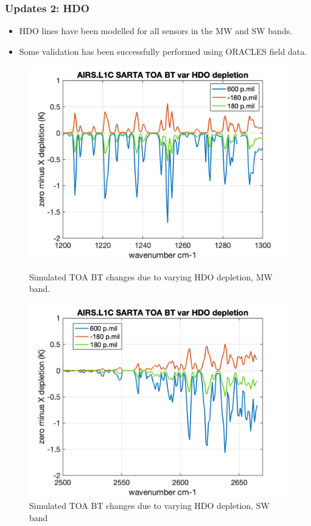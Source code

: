 \documentclass[10pt,t]{beamer}
\begin{document}
\begin{frame}
  \frametitle{Updates 2: HDO}
  \begin{itemize}
    \item HDO lines have been modelled for all sensors in the MW and SW bands.
    \item Some validation has been successfully performed using ORACLES field data.
  \end{itemize}

\begin{figure}
\begin{minipage}[c]{0.45\linewidth}
  \includegraphics[width=\linewidth]{./Figs/airs_l1c_hdo_r49_mw_var_depletion.png}
  \caption{Simulated TOA BT changes due to varying HDO depletion, MW band.}
\end{minipage}
\hfill
\begin{minipage}[c]{0.45\linewidth}
  \includegraphics[width=\linewidth]{./Figs/airs_l1c_hdo_r49_sw_var_depletion.png}
  \caption{Simulated TOA BT changes due to varying HDO depletion, SW band}
\end{minipage}
\end{figure}


\end{frame}
\end{document}
